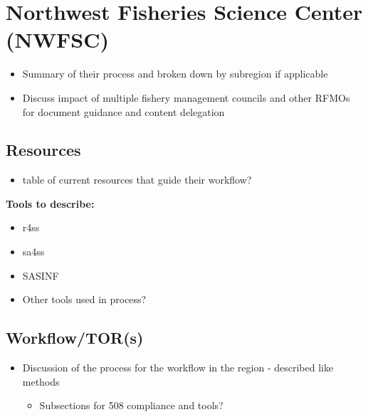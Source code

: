 \documentclass[
  letterpaper,
  oneside,
  open=any]{scrbook}
\providecommand{\tightlist}{%
  \setlength{\itemsep}{0pt}\setlength{\parskip}{0pt}}\usepackage{longtable,booktabs,array}
\begin{document}

\chapter{Northwest Fisheries Science Center
(NWFSC)}\label{northwest-fisheries-science-center-nwfsc}

\begin{itemize}
\item
  Summary of their process and broken down by subregion if applicable
\item
  Discuss impact of multiple fishery management councils and other RFMOs
  for document guidance and content delegation
\end{itemize}

\section{Resources}\label{resources-2}

\begin{itemize}
\tightlist
\item
  table of current resources that guide their workflow?
\end{itemize}

\textbf{Tools to describe:}

\begin{itemize}
\tightlist
\item
  r4ss
\item
  sa4ss
\item
  SASINF
\item
  Other tools used in process?
\end{itemize}

\section{Workflow/TOR(s)}\label{workflowtors}

\begin{itemize}
\item
  Discussion of the process for the workflow in the region - described
  like methods

  \begin{itemize}
  \tightlist
  \item
    Subsections for 508 compliance and tools?
  \end{itemize}
\end{itemize}

\end{document}
